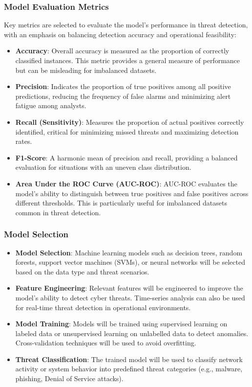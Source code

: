 \documentclass[a4paper,twoside,12pt]{report}
\begin{document}
\subsubsection{Model Evaluation Metrics}
Key metrics are selected to evaluate the model’s performance in threat detection, with an emphasis on balancing detection accuracy and operational feasibility:
\begin{itemize}
    \item \textbf{Accuracy}: Overall accuracy is measured as the proportion of correctly classified instances. This metric provides a general measure of performance but can be misleading for imbalanced datasets.
    \item \textbf{Precision}: Indicates the proportion of true positives among all positive predictions, reducing the frequency of false alarms and minimizing alert fatigue among analysts.
    \item \textbf{Recall (Sensitivity)}: Measures the proportion of actual positives correctly identified, critical for minimizing missed threats and maximizing detection rates.
    \item \textbf{F1-Score}: A harmonic mean of precision and recall, providing a balanced evaluation for situations with an uneven class distribution.
    \item \textbf{Area Under the ROC Curve (AUC-ROC)}: AUC-ROC evaluates the model’s ability to distinguish between true positives and false positives across different thresholds. This is particularly useful for imbalanced datasets common in threat detection.

\end{itemize}
\subsubsection{Model Selection}

\begin{itemize}
    \item \textbf{Model Selection}: Machine learning models such as decision trees, random forests, support vector machines (SVMs), or neural networks will be selected based on the data type and threat scenarios.
    \item \textbf{Feature Engineering}: Relevant features will be engineered to improve the model’s ability to detect cyber threats. Time-series analysis can also be used for real-time threat detection in operational environments.
    \item \textbf{Model Training}: Models will be trained using supervised learning on labeled data or unsupervised learning on unlabelled data to detect anomalies. Cross-validation techniques will be used to avoid overfitting.
    \item \textbf{Threat Classification}: The trained model will be used to classify network activity or system behavior into predefined threat categories (e.g., malware, phishing, Denial of Service attacks).
\end{itemize}
\end{document}
